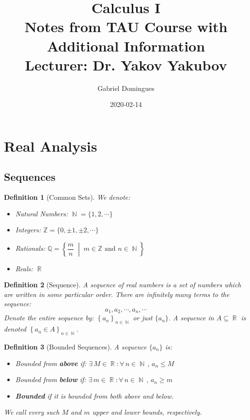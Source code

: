 \documentclass[12pt]{article}
\title{%
  Calculus I \\
  \large Notes from TAU Course with Additional Information \\
  Lecturer: Dr. Yakov Yakubov
}
\author{Gabriel Domingues}
\date{2020-02-14}
\newcommand{\set}[2]{\left\{{#1}\;\middle|\;{#2}\right\}}
\newcommand{\Forall}[1]{\forall\,{#1}\,,\,}
\newcommand{\Exist}[1]{\exists\,{#1}:}
\newcommand{\seq}[2]{\left\{{#1}\right\}_{#2 \in\N}}
\DeclareMathOperator{\N}{\mathbb{N}}
\DeclareMathOperator{\R}{\mathbb{R}}
\newtheorem{definition}{Definition}[subsection]
\begin{document}
\maketitle

\setlength{\parindent}{0ex}
\setlength{\parskip}{1em}

\tableofcontents

\doclicenseThis

\pagebreak

\section{Real Analysis}

\subsection{Sequences}

\begin{definition}[Common Sets]
  We denote:
  \begin{itemize}
    \item[] Natural Numbers: $\N=\{1,2,\cdots\}$ 
    \item[] Integers: $\mathbb{Z} = \{0,\pm 1,\pm 2,\cdots\}$
    \item[] Rationals: $\mathbb{Q}=\set{\dfrac{m}{n}}{m\in\mathbb{Z}\text{ and } n\in\N}$
    \item[] Reals: $\R$
  \end{itemize}
\end{definition}

\begin{definition}[Sequence]
  A sequence of real numbers is a set of numbers which are written in some particular order. There are infinitely many terms to the sequence:
  $$a_1,a_2,\cdots,a_n,\cdots$$
  Denote the entire sequence by: $\seq{a_n}{n}$ or just $\{a_n\}$. A sequence in $A\subseteq \R$ is denoted $\seq{a_n\in A}{n}$.
\end{definition}

\begin{definition}[Bounded Sequences]
  A sequence $\{a_n\}$ is:
  \begin{itemize}
    \item[] Bounded from \textbf{above} if: $\Exist{M\in\R}\Forall{n\in\N}a_n\leq M$
    \item[] Bounded from \textbf{below} if: $\Exist{m\in\R}\Forall{n\in\N}a_n\geq m$
    \item[] \textbf{Bounded} if it is bounded from both above and below.
  \end{itemize}
  We call every such $M$ and $m$ upper and lower bounds, respectively. 
\end{definition}
\end{document}
